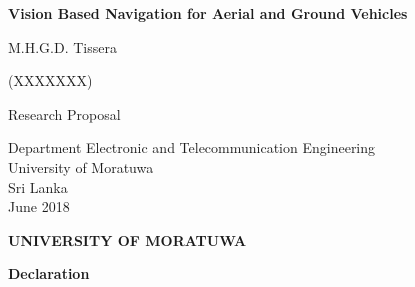 \documentclass[a4paper,oneside,12pt]{report}
\begin{document}
	


\begin{titlepage}
	\begin{center}
		\vspace*{5cm}
		
		\huge
		\textbf{Vision Based Navigation for Aerial and Ground Vehicles }
		
		\vspace{0.5cm}
		
		\large
		\vspace{0.5cm}
		
		M.H.G.D. Tissera
		
		\vspace{0.5cm}
		
		(XXXXXXX)
		\vfill
		
		\normalsize
		Research Proposal 
		
		\vspace{0.8cm}
		\large
		
		Department Electronic and Telecommunication Engineering\\
		\vspace{0.8cm}
		University of Moratuwa\\
		Sri Lanka\\
		\vspace{0.8cm}
		June 2018
		
	\end{center}
\end{titlepage}


\setlength{\parskip}{1em}


\begin{center}
\huge
\textbf{UNIVERSITY OF MORATUWA}
\end{center}

\begin{flushleft}
\large
\textbf{Declaration}
\end{flushleft}
\setlength{\parindent}{0cm}
\end{document}
